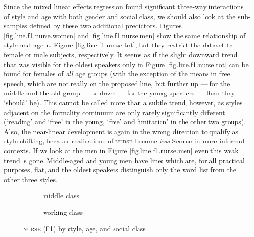 Since the mixed linear effects regression found significant three-way interactions of style and age with both gender and social class, we should also look at the sub-samples defined by these two additional predictors.
Figures \ref{fig.line.f1.nurse.women} and \ref{fig.line.f1.nurse.men} show the same relationship of style and age as Figure \ref{fig.line.f1.nurse.tot}, but they restrict the dataset to female or male subjects, respectively.
It seems as if the slight downward trend that was visible for the oldest speakers only in Figure \ref{fig.line.f1.nurse.tot} can be found for females of \emph{all} age groups (with the exception of the means in free speech, which are not really on the proposed line, but further up --- for the middle and the old group --- or down --- for the young speakers --- than they `should' be).
This cannot be called more than a subtle trend, however, as styles adjacent on the formality continuum are only rarely significantly different (`reading' and `free' in the young, `free' and `imitation' in the other two groups).
Also, the near-linear development is again in the wrong direction to qualify as style-shifting, because realisations of \textsc{nurse} become \emph{less} Scouse in more informal contexts.
If we look at the men in Figure \ref{fig.line.f1.nurse.men} even this weak trend is gone.
Middle-aged and young men have lines which are, for all practical purposes, flat, and the oldest speakers distinguish only the word list from the other three styles.

\begin{figure}[h!]
	\centering
	\begin{subfigure}{.49\textwidth}
		\centering
			\resizebox{\linewidth}{!}{} 
		\caption{middle class}
		\label{fig.line.f1.nurse.mc}
	\end{subfigure}
	\begin{subfigure}{.49\textwidth}
		\centering
			\resizebox{\linewidth}{!}{} 
		\caption{working class}
		\label{fig.line.f1.nurse.wc}
	\end{subfigure}
	\caption{\textsc{nurse} (F1) by style, age, and social class}
\end{figure}

